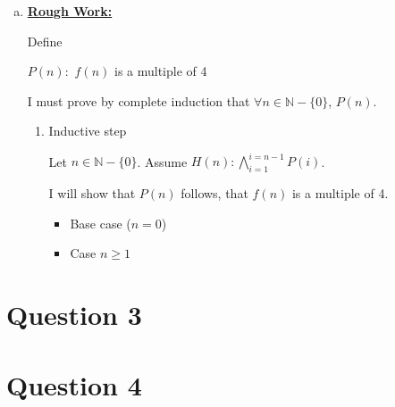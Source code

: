 \documentclass[12pt]{article}
\begin{document}
\begin{enumerate}[a.]



    \item

    \bigskip

    \begin{mdframed}
        \underline{\textbf{Rough Work:}}

        \bigskip

        Define

        \begin{center}
        $P(n):$ $f(n)$ is a multiple of 4
        \end{center}

        \bigskip

        I must prove by complete induction that $\forall n \in \mathbb{N} - \{0\}$, $P(n)$.

        \bigskip

        \begin{enumerate}[1.]
            \item Inductive step

            \bigskip

            Let $n \in \mathbb{N} - \{0\}$. Assume $H(n): \bigwedge\limits_{i=1}^{i=n-1} P(i)$.

            \bigskip

            I will show that $P(n)$ follows, that $f(n)$ is a multiple of 4.

            \bigskip

            \begin{itemize}
                \item Base case ($n = 0$)
                \item Case $n \geq 1$
            \end{itemize}
        \end{enumerate}

    \end{mdframed}

\end{enumerate}

\section*{Question 3}

\section*{Question 4}
\end{document}
